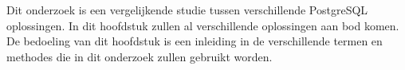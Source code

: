 \chapter{}
\label{ch:stand-van-zaken}

Dit onderzoek is een vergelijkende studie tussen verschillende PostgreSQL oplossingen. In dit hoofdstuk zullen al verschillende oplossingen aan bod komen. De bedoeling van dit hoofdstuk is een inleiding in de verschillende termen en methodes die in dit onderzoek zullen gebruikt worden.




